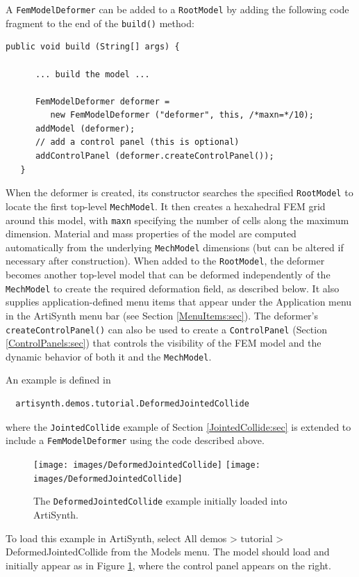 A {\tt FemModelDeformer} can be added to a {\tt RootModel} by adding
the following code fragment to the end of the {\tt build()} method:
%
\begin{lstlisting}[]
   public void build (String[] args) {

      ... build the model ...

      FemModelDeformer deformer =
         new FemModelDeformer ("deformer", this, /*maxn=*/10);
      addModel (deformer);
      // add a control panel (this is optional)
      addControlPanel (deformer.createControlPanel());  
   }
\end{lstlisting}
%
When the deformer is created, its constructor searches the specified
{\tt RootModel} to locate the first top-level {\tt MechModel}. It then
creates a hexahedral FEM grid around this model, with {\tt maxn} specifying
the number of cells along the maximum dimension. Material and
mass properties of the model are computed automatically from the
underlying {\tt MechModel} dimensions (but can be altered if necessary after
construction). When added to the {\tt RootModel},
the deformer becomes another top-level model that can be deformed
independently of the {\tt MechModel} to create the required
deformation field, as described below. It also supplies application-defined
menu items that appear under the {\sf Application} menu in the ArtiSynth
menu bar (see Section \ref{MenuItems:sec}). 
The deformer's {\tt createControlPanel()} can also be used
to create a {\tt ControlPanel} (Section \ref{ControlPanels:sec}) that
controls the visibility of the FEM model and the dynamic behavior of
both it and the {\tt MechModel}.

An example is defined in 
%
\begin{verbatim}
  artisynth.demos.tutorial.DeformedJointedCollide
\end{verbatim}
%
where the {\tt JointedCollide} example of Section
\ref{JointedCollide:sec} is extended to include a 
{\tt FemModelDeformer} using the code described above.

\begin{figure}[ht]
\begin{center}
\iflatexml
 \texttt{[image: images/DeformedJointedCollide]}
\else
 \texttt{[image: images/DeformedJointedCollide]}
\fi
\end{center}
\caption{The {\tt DeformedJointedCollide} example initially loaded
into ArtiSynth.}
\label{DeformedJointedCollide:fig}
\end{figure}

To load this example in ArtiSynth, select {\sf All demos > tutorial >
DeformedJointedCollide} from the {\sf Models} menu. The model should load and
initially appear as in Figure \ref{DeformedJointedCollide:fig}, where
the control panel appears on the right.

